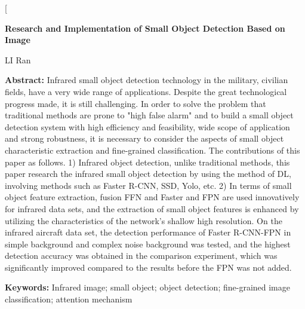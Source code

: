 \documentclass[10.5pt,twocolumn]{aaas}
\begin{document}
\twocolumn[
  \begin{@twocolumnfalse}\vspace*{1cm}

\parbox{\textwidth}{

\xiaosihao\ArialFont\textbf{Research and Implementation of Small Object Detection Based on Image}
\vspace*{0.3cm}

{\xiaosihao LI Ran}\\[0.3cm]

\vspace*{0.3cm}

\xiaowuhao
{
\renewcommand{\baselinestretch}{0.8}
\ArialFont
\textbf{Abstract:} 
Infrared small object detection technology in the military, civilian fields, have a very wide range of applications. Despite the great technological progress made, it is still challenging. In order to solve the problem that traditional methods are prone to "high false alarm" and to build a small object detection system with high efficiency and feasibility, wide scope of application and strong robustness, it is necessary to consider the aspects of small object characteristic extraction and fine-grained classification. The contributions of this paper as follows.
1)	Infrared object detection, unlike traditional methods, this paper research the infrared small object detection by using the method of DL, involving methods such as Faster R-CNN, SSD, Yolo, etc.
2)	In terms of small object feature extraction, fusion FFN and Faster and FPN are used innovatively for infrared data sets, and the extraction of small object features is enhanced by utilizing the characteristics of the network's shallow high resolution. On the infrared aircraft data set, the detection performance of Faster R-CNN-FPN in simple background and complex noise background was tested, and the highest detection accuracy was obtained in the comparison experiment, which was significantly improved compared to the results before the FPN was not added.


\textbf{Keywords:} Infrared image; small object; object detection; fine-grained image classification; attention mechanism
}
}



\end{@twocolumnfalse}
\end{document}

